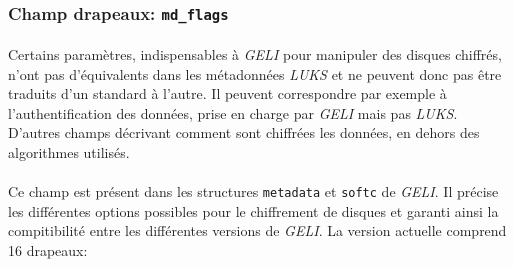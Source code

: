 \subsubsection{Champ drapeaux: \texttt{md\_flags}}
\paragraph{}
Certains paramètres, indispensables à \textit{GELI} pour manipuler des disques
chiffrés, n'ont pas d'équivalents dans les métadonnées \textit{LUKS} et ne
peuvent donc pas être traduits d'un standard à l'autre. Il peuvent correspondre
par exemple à l'authentification des données, prise en charge par \textit{GELI}
mais pas \textit{LUKS}. D'autres champs décrivant comment sont chiffrées les
données, en dehors des algorithmes utilisés.
\paragraph{}
Ce champ est présent dans les structures \texttt{metadata} et \texttt{softc} de
\textit{GELI}. Il précise les différentes options possibles pour le chiffrement
de disques et garanti ainsi la compitibilité entre les différentes versions de
\textit{GELI}. La version actuelle comprend 16 drapeaux: \\
\\
